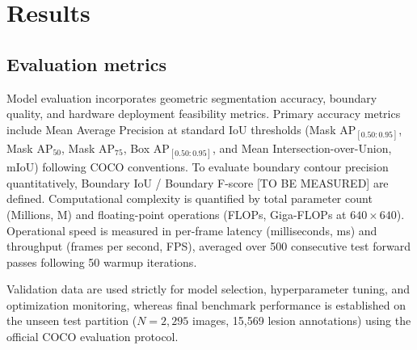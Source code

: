 \documentclass[5p,times]{elsarticle}
\begin{document}
\section{Results}
\label{sec:results}

\subsection{Evaluation metrics}
Model evaluation incorporates geometric segmentation accuracy, boundary quality, and hardware deployment feasibility metrics. Primary accuracy metrics include Mean Average Precision at standard IoU thresholds (Mask $\mathrm{AP}_{[0.50:0.95]}$, Mask $\mathrm{AP}_{50}$, Mask $\mathrm{AP}_{75}$, Box $\mathrm{AP}_{[0.50:0.95]}$, and Mean Intersection-over-Union, mIoU) following COCO conventions. To evaluate boundary contour precision quantitatively, Boundary IoU / Boundary F-score [TO BE MEASURED] are defined. Computational complexity is quantified by total parameter count (Millions, M) and floating-point operations (FLOPs, Giga-FLOPs at $640 \times 640$). Operational speed is measured in per-frame latency (milliseconds, ms) and throughput (frames per second, FPS), averaged over 500 consecutive test forward passes following 50 warmup iterations.

Validation data are used strictly for model selection, hyperparameter tuning, and optimization monitoring, whereas final benchmark performance is established on the unseen test partition ($N=2,295$ images, 15,569 lesion annotations) using the official COCO evaluation protocol.
\end{document}
